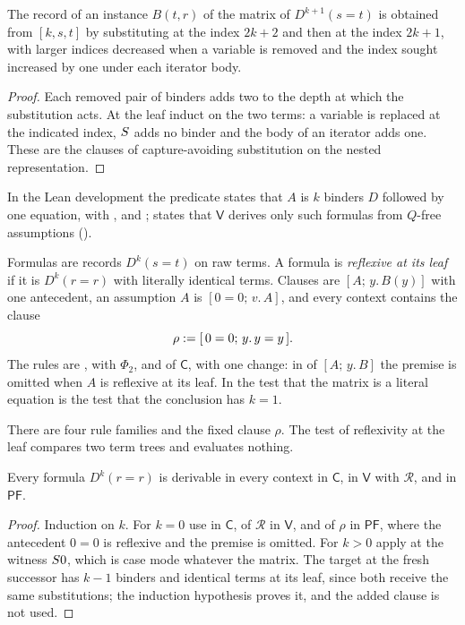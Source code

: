 \begin{lemma}
\label{claus:lem:packing}
The record of an instance $B(t,r)$ of the matrix of $D^{k+1}(s=t)$ is
obtained from $[k,s,t]$ by substituting at the index $2k+2$ and then at the
index $2k+1$, with larger indices decreased when a variable is removed and
the index sought increased by one under each iterator body.
\end{lemma}
\begin{proof}
Each removed pair of binders adds two to the depth at which the
substitution acts. At the leaf induct on the two terms: a variable is
replaced at the indicated index, $S$ adds no binder and the body of an
iterator adds one. These are the clauses of capture-avoiding substitution
on the nested representation.
\end{proof}

In the Lean development the predicate  states that $A$ is
$k$ binders $D$ followed by one equation, with ,
 and ;  states that
$\mathsf{V}$ derives only such formulas from $Q$-free assumptions
().

\begin{definition}
\label{claus:def:pf}
Formulas are records $D^k(s=t)$ on raw terms. A formula is
\emph{reflexive at its leaf} if it is $D^k(r=r)$ with literally identical
terms. Clauses are $[A;\,y.\,B(y)]$ with one antecedent, an assumption $A$
is $[0=0;\,v.\,A]$, and every context contains the clause
\[
 \rho\mathrel{:=}[\,0=0;\,y.\,y=y\,].
\]
The rules are ,  with $\Phi_2$,
 and  of $\mathsf{C}$, with one change: in
 of $[A;\,y.\,B]$ the premise is omitted when $A$ is
reflexive at its leaf. In  the test that the matrix is a
literal equation is the test that the conclusion has $k=1$.
\end{definition}

There are four rule families and the fixed clause $\rho$. The test of
reflexivity at the leaf compares two term trees and evaluates nothing.

\begin{lemma}
\label{claus:lem:reflprefix}
Every formula $D^k(r=r)$ is derivable in every context in $\mathsf{C}$, in
$\mathsf{V}$ with $\mathcal{R}$, and in $\mathsf{PF}$.
\end{lemma}
\begin{proof}
Induction on $k$. For $k=0$ use  in $\mathsf{C}$,
 of $\mathcal{R}$ in $\mathsf{V}$, and  of
$\rho$ in $\mathsf{PF}$, where the antecedent $0=0$ is reflexive and the
premise is omitted. For $k>0$ apply  at the witness
$S 0$, which is case mode whatever the matrix. The target at the fresh
successor has $k-1$ binders and identical terms at its leaf, since both
receive the same substitutions; the induction hypothesis proves it, and
the added clause is not used.
\end{proof}

